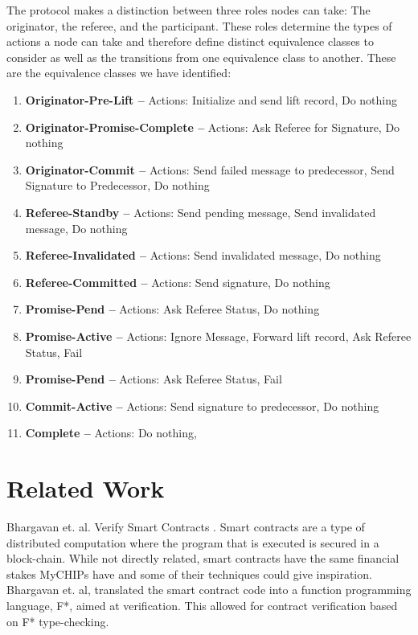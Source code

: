 \documentclass[article, onecolumn, 12pt]{IEEEtran}
\begin{document}
The protocol makes a distinction between three roles nodes can take: The originator, the referee, and the participant. These roles determine the types of actions a node can take and therefore define distinct equivalence classes to consider as well as the transitions from one equivalence class to another. These are the equivalence classes we have identified:
\begin{enumerate}
\item \textbf{Originator-Pre-Lift --} Actions: Initialize and send lift record, Do nothing
\item \textbf{Originator-Promise-Complete --} Actions: Ask Referee for Signature, Do nothing
\item \textbf{Originator-Commit --} Actions: Send failed message to predecessor, Send Signature to Predecessor, Do nothing

\item \textbf{Referee-Standby --} Actions: Send pending message, Send invalidated message, Do nothing
\item \textbf{Referee-Invalidated --} Actions: Send invalidated message, Do nothing
\item \textbf{Referee-Committed --} Actions: Send signature, Do nothing


\item \textbf{Promise-Pend --} Actions: Ask Referee Status, Do nothing
\item \textbf{Promise-Active --} Actions: Ignore Message, Forward lift record, Ask Referee Status, Fail
\item \textbf{Promise-Pend --} Actions: Ask Referee Status, Fail
\item \textbf{Commit-Active --} Actions: Send signature to predecessor, Do nothing
\item \textbf{Complete --} Actions: Do nothing,

\end{enumerate}

\section{Related Work}
 Bhargavan et. al. Verify Smart Contracts \cite{SmartContracts}. Smart contracts are a type of distributed computation where the program that is executed is secured in a block-chain. While not directly related, smart contracts have the same financial stakes MyCHIPs have and some of their techniques could give inspiration.  Bhargavan et. al, translated the smart contract code into a function programming language, F*, aimed at verification. This allowed for contract verification based on F* type-checking.
 
\end{document}
